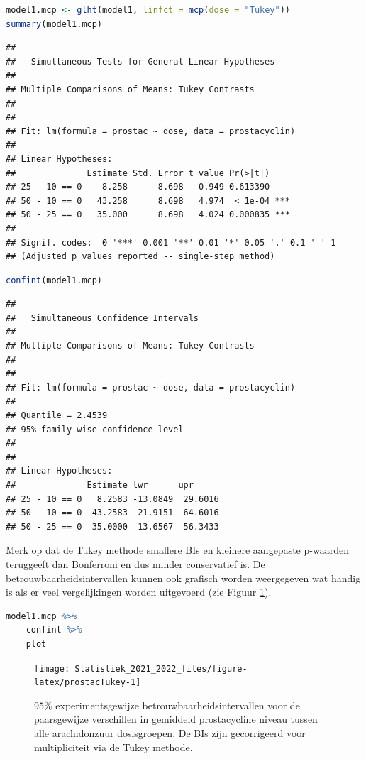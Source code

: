 \documentclass[
  12pt,dutch,coursenotes]{book}
\theoremstyle{definition}
\theoremstyle{definition}
\theoremstyle{definition}
\theoremstyle{definition}
\theoremstyle{remark}
\begin{document}
\begin{lstlisting}[language=R]
model1.mcp <- glht(model1, linfct = mcp(dose = "Tukey"))
summary(model1.mcp)
\end{lstlisting}

\begin{lstlisting}
## 
##   Simultaneous Tests for General Linear Hypotheses
## 
## Multiple Comparisons of Means: Tukey Contrasts
## 
## 
## Fit: lm(formula = prostac ~ dose, data = prostacyclin)
## 
## Linear Hypotheses:
##              Estimate Std. Error t value Pr(>|t|)    
## 25 - 10 == 0    8.258      8.698   0.949 0.613390    
## 50 - 10 == 0   43.258      8.698   4.974  < 1e-04 ***
## 50 - 25 == 0   35.000      8.698   4.024 0.000835 ***
## ---
## Signif. codes:  0 '***' 0.001 '**' 0.01 '*' 0.05 '.' 0.1 ' ' 1
## (Adjusted p values reported -- single-step method)
\end{lstlisting}

\begin{lstlisting}[language=R]
confint(model1.mcp)
\end{lstlisting}

\begin{lstlisting}
## 
##   Simultaneous Confidence Intervals
## 
## Multiple Comparisons of Means: Tukey Contrasts
## 
## 
## Fit: lm(formula = prostac ~ dose, data = prostacyclin)
## 
## Quantile = 2.4539
## 95% family-wise confidence level
##  
## 
## Linear Hypotheses:
##              Estimate lwr      upr     
## 25 - 10 == 0   8.2583 -13.0849  29.6016
## 50 - 10 == 0  43.2583  21.9151  64.6016
## 50 - 25 == 0  35.0000  13.6567  56.3433
\end{lstlisting}

Merk op dat de Tukey methode smallere BIs en kleinere aangepaste p-waarden teruggeeft dan Bonferroni en dus minder conservatief is.
De betrouwbaarheidsintervallen kunnen ook grafisch worden weergegeven wat handig is als er veel vergelijkingen worden uitgevoerd (zie Figuur \ref{fig:prostacTukey}).

\begin{lstlisting}[language=R]
model1.mcp %>%
    confint %>%
    plot
\end{lstlisting}

\begin{figure}

{\centering \texttt{[image: Statistiek\_2021\_2022\_files/figure-latex/prostacTukey-1]} 

}

\caption{$95\%$ experimentsgewijze betrouwbaarheidsintervallen voor de paarsgewijze verschillen in gemiddeld prostacycline niveau tussen alle arachidonzuur dosisgroepen. De BIs zijn gecorrigeerd voor multipliciteit via de Tukey methode.}\label{fig:prostacTukey}
\end{figure}
\end{document}
